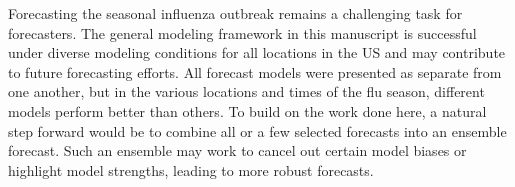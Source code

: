 Forecasting the seasonal influenza outbreak remains a challenging task for 
forecasters. The general modeling framework in this manuscript is successful 
under diverse modeling conditions for all locations in the US and may 
contribute to future forecasting efforts. All forecast models were presented 
as separate from one another, but in the various locations and times of the 
flu season, different models perform better than others. To build on the work 
done here, a natural step forward would be to combine all or a few selected 
forecasts into an ensemble forecast. Such an ensemble may work to cancel out 
certain model biases or highlight model strengths, leading to more robust 
forecasts. 
